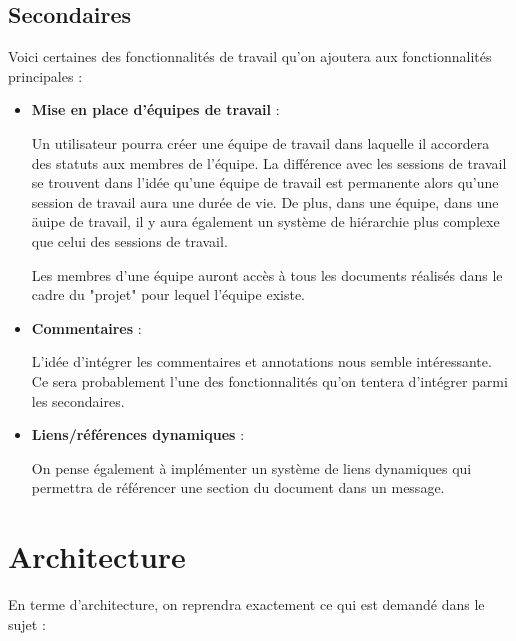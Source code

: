 	\newpage
	\subsection{Secondaires}
	
		Voici certaines des fonctionnalités de travail qu'on ajoutera aux fonctionnalités principales : \par 
		
		\begin{itemize}
		
			\item \textbf{Mise en place d'équipes de travail} : \par
			Un utilisateur pourra créer une équipe de travail dans laquelle il accordera des statuts aux membres de l'équipe. La différence avec les sessions de travail se trouvent dans l'idée qu'une équipe de travail est permanente alors qu'une session de travail aura une durée de vie. De plus, dans une équipe, dans une äuipe de travail, il y aura également un système de hiérarchie plus complexe que celui des sessions de travail. \par
			Les membres d'une équipe auront accès à tous les documents réalisés dans le cadre du "projet" pour lequel l'équipe existe.
			
			\item \textbf{Commentaires} : \par
			L'idée d'intégrer les commentaires et annotations nous semble intéressante. Ce sera probablement l'une des fonctionnalités qu'on tentera d'intégrer parmi les secondaires.
			
			
			\item \textbf{Liens/références dynamiques} : \par
			On pense également à implémenter un système de liens dynamiques qui permettra de référencer une section du document dans un message.
		
			
		\end{itemize}
		
		\section{Architecture}
		
		En terme d'architecture, on reprendra exactement ce qui est demandé dans le sujet :
		
